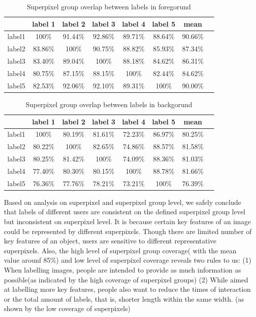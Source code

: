 \documentclass[runningheads,a4paper]{llncs}
\begin{document}
\begin{table}[!tb]
\centering
\caption{Superpixel group overlap between labels in foregorund}
\begin{tabular}{|c|c|c|c|c|c|c|c|}
\hline
 & label 1 & label 2&label 3&label 4&label 5&mean\\
\hline
label1& 100\% & 91.44\% & 92.86\%& 89.71\%& 88.64\%&90.66\%\\
\hline
label2& 83.86\% & 100\% & 90.75\%& 88.82\%& 85.93\%&87.34\%\\
\hline
label3& 83.40\% & 89.04\% & 100\%& 88.18\%& 84.62\%&86.31\% \\
\hline
label4& 80.75\% & 87.15\% & 88.15\%& 100\%& 82.44\%&84.62\% \\
\hline
label5& 82.53\% & 92.06\% & 92.10\%& 89.31\%& 100\%&90.00\% \\
\hline
\end{tabular}\captionsetup{justification=centerlast}
\label{ta:group overlap f}
\end{table}

\begin{table}[!tb]
\centering
\caption{Superpixel group overlap between labels in backgorund}
\begin{tabular}{|c|c|c|c|c|c|c|c|}
\hline
 & label 1 & label 2&label 3&label 4&label 5&mean\\
\hline
label1& 100\% &80.19\% & 81.61\%& 72.23\%& 86.97\%&80.25\%\\
\hline
label2& 80.22\% & 100\% & 82.65\%& 74.86\%& 88.57\%&81.58\% \\
\hline
label3& 80.25\% & 81.42\% & 100\%& 74.09\%& 88.36\%&81.03\%\\
\hline
label4& 77.40\% & 80.30\% & 80.15\%& 100\%& 88.78\%&81.66\% \\
\hline
label5& 76.36\% & 77.76\% & 78.21\%& 73.21\%& 100\%&76.39\%\\
\hline
\end{tabular}
\captionsetup{justification=centerlast}
\label{ta:group overlap b}
\end{table}

Based on analysis on superpixel and superpixel group level, we safely conclude that labels of different users are consistent on the defined superpixel group level but inconsistent on superpixel level. It is because certain key features of an image could be represented by different superpixels. Though there are limited number of key features of an object, users are sensitive to different representative superpixels. Also, the high level of superpixel group coverage( with the mean value arounf 85\%) and low level of superpixel coverage reveals two rules to us: (1) When labelling images, people are intended to provide as much information as possible(as indicated by the high coverage of superpixel groups)  (2) While aimed at labelling more key features, people also want to reduce the times of interaction or the total amount of labels, that is, shorter length within the same width. (as shown by the low coverage of superpixels)
\end{document}
